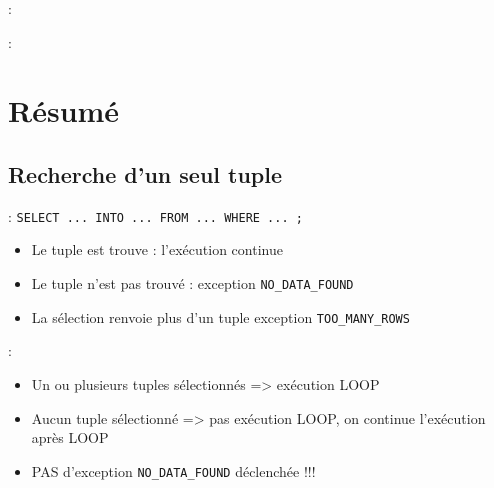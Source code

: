 \documentclass[10pt]{beamer}
\begin{document}
\begin{frame}[allowframebreaks]{\secname : \subsecname}
    
\end{frame}

\begin{frame}[allowframebreaks]{\secname : \subsecname}
    
\end{frame}

\section{Résumé}
\tocss
\subsection{Recherche d'un seul tuple}
\begin{frame}{\secname : \subsecname}
    \lstinline[language=plsql]!SELECT ... INTO ... FROM ... WHERE ... ;!
    \begin{itemize}
        \item Le tuple est trouve : l'exécution continue
        \item Le tuple n'est pas trouvé : 
            exception \lstinline[language=plsql]!NO_DATA_FOUND!
        \item La sélection renvoie plus d'un tuple
            exception \lstinline[language=plsql]!TOO_MANY_ROWS!
    \end{itemize}
\end{frame}

\begin{frame}{\secname : \subsecname}
    
\begin{itemize}
    \item Un ou plusieurs tuples sélectionnés => exécution LOOP
    \item Aucun tuple sélectionné => pas exécution LOOP, on continue l'exécution après LOOP
    \item PAS d'exception \lstinline[language=plsql]!NO_DATA_FOUND! déclenchée !!!
\end{itemize}
\end{frame}
\end{document}
